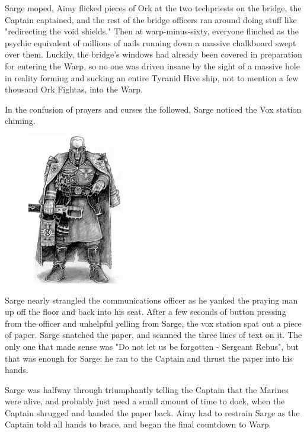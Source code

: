 Sarge moped, Aimy flicked pieces of Ork at the two techpriests on the bridge, the Captain captained, and the rest of the bridge officers ran around doing stuff like "redirecting the void shields." Then at warp-minus-sixty, everyone flinched as the psychic equivalent of millions of nails running down a massive chalkboard swept over them. 
Luckily, the bridge's windows had already been covered in preparation for entering the Warp, so no one was driven insane by the sight of a massive hole in reality forming and sucking an entire Tyranid Hive ship, not to mention a few thousand Ork Fightas, into the Warp.

In the confusion of prayers and curses the followed, Sarge noticed the Vox station chiming.
\begin{figure}
	\begin{center}
		\includegraphics[width=\figwidth]{pics/12/73.png}
	\end{center}
\end{figure}
Sarge nearly strangled the communications officer as he yanked the praying man up off the floor and back into his seat. 
After a few seconds of button pressing from the officer and unhelpful yelling from Sarge, the vox station spat out a piece of paper. 
Sarge snatched the paper, and scanned the three lines of text on it. 
The only one that made sense was "Do not let us be forgotten - Sergeant Rebus", but that was enough for Sarge: 
he ran to the Captain and thrust the paper into his hands. 


Sarge was halfway through triumphantly telling the Captain that the Marines were alive, and probably just need a small amount of time to dock, when the Captain shrugged and handed the paper back. 
Aimy had to restrain Sarge as the Captain told all hands to brace, and began the final countdown to Warp.

